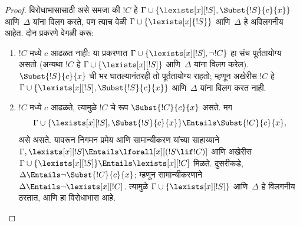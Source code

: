 \documentclass[../../../include/open-logic-section]{subfiles}
\begin{document}
\begin{proof}
विरोधाभासासाठी असे समजा की $!C$ हे $\Gamma \cup \{ \lexists[x][!S],
\Subst{!S}{c}{x}\}$ आणि~$\Delta$ यांना विलग करते, पण त्याच वेळी
$\Gamma \cup \{\lexists[x]{!S} \}$ आणि~$\Delta$ हे अविलगनीय आहेत. दोन
प्रकरणे वेगळी करू:
\begin{enumerate}
\item $!C$ मध्ये $c$ आढळत नाही: या प्रकरणात $\Gamma \cup
  \{\lexists[x][!S], \lnot!C \}$ हा संच पूर्ततायोग्य असतो (अन्यथा
  $!C$ हे $\Gamma \cup \{\lexists[x][!S] \}$ आणि~$\Delta$ यांना विलग
  करेल). $\Subst{!S}{c}{x}$ ची भर घातल्यानंतरही तो पूर्ततायोग्य राहतो;
  म्हणून अखेरीस $!C$ हे $\Gamma \cup \{ \lexists[x][!S],
  \Subst{!S}{c}{x} \}$ आणि~$\Delta$ यांना विलग करत नाही.
\item $!C$ मध्ये $c$ आढळते, त्यामुळे $!C$ चे रूप
  $\Subst{!C}{c}{x}$ असते. मग
  \[
  \Gamma \cup \{ \lexists[x][!S], \Subst{!S}{c}{x}\} \Entails \Subst{!C}{c}{x},
  \]
  असे असते. यावरून निगमन प्रमेय आणि सामान्यीकरण यांच्या साहाय्याने
  $\Gamma, \lexists[x][!S] \Entails \lforall[x][(!S \lif !C)]$ आणि
  अखेरीस $\Gamma \cup \{ \lexists[x][!S] \} \Entails
  \lexists[x][!C]$ मिळते. दुसरीकडे, $\Delta \Entails \lnot
  \Subst{!C}{c}{x}$; म्हणून सामान्यीकरणाने $\Delta \Entails \lnot
  \lexists[x][!C]$. त्यामुळे $\Gamma \cup \{\lexists[x][!S] \}$
  आणि~$\Delta$ हे विलगनीय ठरतात, आणि हा विरोधाभास आहे.
\end{enumerate}
\end{proof}
\end{document}
